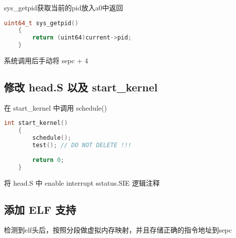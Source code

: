 \documentclass{source/Report}
\begin{document}
sys\_getpid获取当前的pid放入a0中返回

\begin{lstlisting}[language = c, title = {sys\_getpid}]
    uint64_t sys_getpid()
    {
        return (uint64)current->pid;
    }
\end{lstlisting}

系统调用后手动将 sepc + 4

\subsection{修改 head.S 以及 start\_kernel}

在 start\_kernel 中调用 schedule() 

\begin{lstlisting}[language = c, title = {start\_kernel}]
    int start_kernel()
    {
        schedule();
        test(); // DO NOT DELETE !!!
    
        return 0;
    }
\end{lstlisting}

将 head.S 中 enable interrupt sstatus.SIE 逻辑注释

\subsection{添加 ELF 支持}

检测到elf头后，按照分段做虚拟内存映射，并且存储正确的指令地址到sepc
\end{document}
